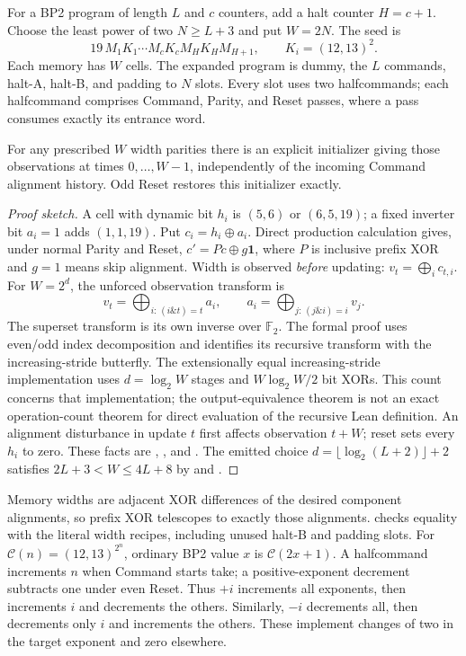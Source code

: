 For a BP2 program of length $L$ and $c$ counters, add a halt counter $H=c+1$.
Choose the least power of two $N\geq L+3$ and put $W=2N$.
The seed is
\[
19\,M_1K_1\cdots M_cK_cM_HK_HM_{H+1},
\qquad K_i=(12,13)^2.
\]
Each memory has $W$ cells.  The expanded program is dummy, the $L$ commands,
halt-A, halt-B, and padding to $N$ slots.  Every slot uses two halfcommands;
each halfcommand comprises Command, Parity, and Reset passes, where a pass
consumes exactly its entrance word.

\begin{lemma}
For any prescribed $W$ width parities there is an explicit initializer giving
those observations at times $0,\ldots,W-1$, independently of the incoming
Command alignment history.  Odd Reset restores this initializer exactly.
\end{lemma}

\begin{proof}[Proof sketch]
A cell with dynamic bit $h_i$ is $(5,6)$ or $(6,5,19)$; a fixed inverter bit
$a_i=1$ adds $(1,1,19)$.  Put $c_i=h_i\oplus a_i$.
Direct production calculation gives, under normal Parity and Reset,
$c'=Pc\oplus g\mathbf1$, where $P$ is inclusive prefix XOR and $g=1$ means
skip alignment.  Width is observed \emph{before} updating:
$v_t=\bigoplus_i c_{t,i}$.
For $W=2^d$, the unforced observation transform is
\[
 v_t=\bigoplus_{i:\,(i\mathbin{\&}t)=t}a_i,
 \qquad
 a_i=\bigoplus_{j:\,(j\mathbin{\&}i)=i}v_j.
\]
The superset transform is its own inverse over $\mathbb F_2$.
The formal proof uses even/odd index decomposition and identifies its recursive
transform with the increasing-stride butterfly.  The extensionally equal increasing-stride implementation uses
$d=\log_2W$ stages and $W\log_2W/2$ bit XORs. This count concerns that
implementation; the output-equivalence theorem is not an exact operation-count
theorem for direct evaluation of the recursive Lean definition.  An alignment disturbance in
update $t$ first affects observation $t+W$; reset sets every $h_i$ to zero.
These facts are ,
, and
.  The emitted choice
$d=\lfloor\log_2(L+2)\rfloor+2$ satisfies
$2L+3<W\leq4L+8$ by  and
.
\end{proof}

Memory widths are adjacent XOR differences of the desired component
alignments, so prefix XOR telescopes to exactly those alignments.
 checks equality with the
literal width recipes, including unused halt-B and padding slots.
For $\mathcal C(n)=(12,13)^{2^n}$, ordinary BP2 value $x$ is
$\mathcal C(2x+1)$.  A halfcommand increments $n$ when Command starts take;
a positive-exponent decrement subtracts one under even Reset.
Thus $+i$ increments all exponents, then increments $i$ and decrements the
others.  Similarly, $-i$ decrements all, then decrements only $i$ and
increments the others.  These implement changes of two in the target
exponent and zero elsewhere.

